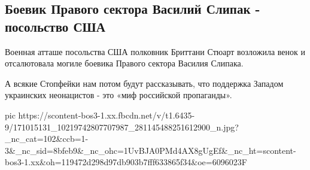  
 
 
 
 

\subsection{Боевик Правого сектора Василий Слипак - посольство США}

Военная атташе посольства США полковник Бриттани Стюарт возложила венок и
отсалютовала могиле боевика Правого сектора Василия Слипака.  

А всякие Стопфейки нам потом будут рассказывать, что поддержка Западом
украинских неонацистов - это «миф российской пропаганды».

\ifcmt
  pic https://scontent-bos3-1.xx.fbcdn.net/v/t1.6435-9/171015131_10219742807707987_281145488251612900_n.jpg?_nc_cat=102&ccb=1-3&_nc_sid=8bfeb9&_nc_ohc=1UvBJA0PMd4AX8gUgEf&_nc_ht=scontent-bos3-1.xx&oh=119472d298d97db903b7fff633865f34&oe=6096023F
\fi
